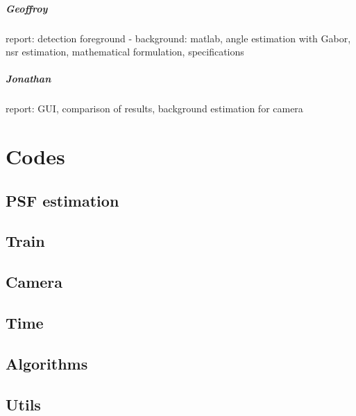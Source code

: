 \paragraph{Geoffroy} report: detection foreground - background: matlab, angle estimation with Gabor, nsr estimation, mathematical formulation, specifications
\paragraph{Jonathan} report: GUI, comparison of results, background estimation for camera


\chapter{Codes}

\section{PSF estimation}

\section{Train}

\section{Camera}

\section{Time}

\section{Algorithms}

\section{Utils}

